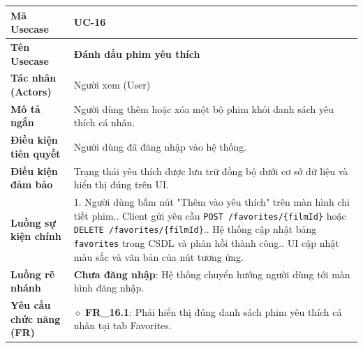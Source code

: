 \begin{table}[H]
\renewcommand{\arraystretch}{1.3}
\centering
\begin{tabularx}{\textwidth}{|p{4.5cm}|X|}
\hline
\cellcolor{gray!15}\bfseries Mã Usecase & \textbf{UC-16} \\ \hline
\cellcolor{gray!15}\bfseries Tên Usecase & \textbf{Đánh dấu phim yêu thích} \\ \hline
\cellcolor{gray!15}\bfseries Tác nhân (Actors) & Người xem (User) \\ \hline
\cellcolor{gray!15}\bfseries Mô tả ngắn & Người dùng thêm hoặc xóa một bộ phim khỏi danh sách yêu thích cá nhân. \\ \hline
\cellcolor{gray!15}\bfseries Điều kiện tiên quyết & Người dùng đã đăng nhập vào hệ thống. \\ \hline
\cellcolor{gray!15}\bfseries Điều kiện đảm bảo & Trạng thái yêu thích được lưu trữ đồng bộ dưới cơ sở dữ liệu và hiển thị đúng trên UI. \\ \hline
\cellcolor{gray!15}\bfseries Luồng sự kiện chính & 1. Người dùng bấm nút "Thêm vào yêu thích" trên màn hình chi tiết phim.\newline 2. Client gửi yêu cầu \texttt{POST /favorites/\{filmId\}} hoặc \texttt{DELETE /favorites/\{filmId\}}.\newline 3. Hệ thống cập nhật bảng \texttt{favorites} trong CSDL và phản hồi thành công.\newline 4. UI cập nhật màu sắc và văn bản của nút tương ứng. \\ \hline
\cellcolor{gray!15}\bfseries Luồng rẽ nhánh & \textbf{Chưa đăng nhập}: Hệ thống chuyển hướng người dùng tới màn hình đăng nhập. \\ \hline
\cellcolor{gray!15}\bfseries Yêu cầu chức năng (FR) & $\diamond$ \textbf{FR\_16.1}: Phải hiển thị đúng danh sách phim yêu thích cá nhân tại tab Favorites. \\ \hline
\end{tabularx}
\end{table}

